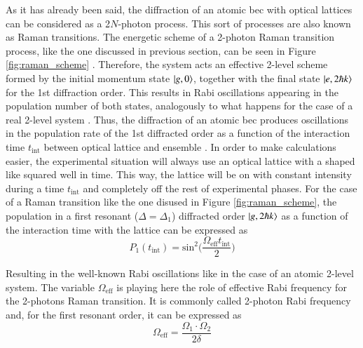 As it has already been said, the diffraction of an atomic \ac{bec} with optical lattices can be considered as a 2$N$-photon process. This sort of processes are also known as Raman transitions. The energetic scheme of a 2-photon Raman transition process, like the one discussed in previous section, can be seen in Figure \ref{fig:raman_scheme} \cite{Kozuma1999}. Therefore, the system acts an effective 2-level scheme formed by the initial momentum state $\ket{g, 0}$, together with the final state $\ket{e, 2\hbar k}$ for the 1st diffraction order. This results in Rabi oscillations appearing in the population number of both states, analogously to what happens for the case of a real 2-level system \cite{Foot2005}. Thus, the diffraction of an atomic \ac{bec} produces oscillations in the population rate of the 1st diffracted order as a function of the interaction time $t_\text{int}$ between optical lattice and ensemble \cite{Martin1988}. In order to make calculations easier, the experimental situation will always use an optical lattice with a shaped like squared well in time. This way, the lattice will be on with constant intensity during a time $t_{\text{int}}$ and completely off the rest of experimental phases. For the case of a Raman transition like the one disused in Figure \ref{fig:raman_scheme}, the population in a first resonant ($\Delta=\Delta_1$) diffracted order $\ket{g, 2\hbar k}$ as a function of the interaction time with the lattice can be expressed as
\begin{equation}\label{eq:population_excited_state}
	P_1(t_\text{int}) = \text{sin}^2\bigg(\frac{\Omega_\text{eff} t_\text{int}}{2}\bigg)
\end{equation}

Resulting in the well-known Rabi oscillations like in the case of an atomic 2-level system. The variable $\Omega_\text{eff}$ is playing here the role of effective Rabi frequency for the 2-photons Raman transition. It is commonly called 2-photon Rabi frequency and, for the first resonant order, it can be expressed as
\begin{equation}\label{eq:effective_Rabi_frequency}
	\Omega_\text{eff} = \frac{\Omega_1 \cdot \Omega_2}{2\delta}
\end{equation}

